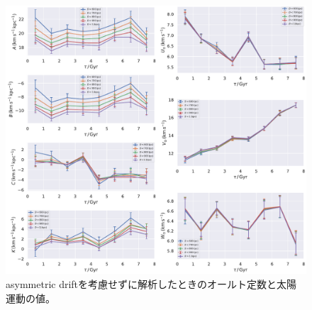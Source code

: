 \begin{figure}[htbp]
	\centering
	\includegraphics[width=15cm]{fig/Observation_woAD.pdf}
	\caption{asymmetric driftを考慮せずに解析したときのオールト定数と太陽運動の値。} \label{fig:woAD}
\end{figure}




